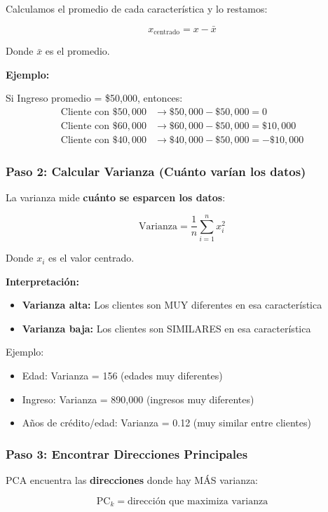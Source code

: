 \documentclass[11pt,a4paper,spanish]{article}
\begin{document}
Calculamos el promedio de cada característica y lo restamos:

\[
x_{\text{centrado}} = x - \bar{x}
\]

Donde $\bar{x}$ es el promedio.

\textbf{Ejemplo:}

Si Ingreso promedio = \$50,000, entonces:
\begin{align*}
\text{Cliente con } \$50,000 &\to \$50,000 - \$50,000 = 0\\
\text{Cliente con } \$60,000 &\to \$60,000 - \$50,000 = \$10,000\\
\text{Cliente con } \$40,000 &\to \$40,000 - \$50,000 = -\$10,000
\end{align*}

\subsubsection{Paso 2: Calcular Varianza (Cuánto varían los datos)}

La varianza mide \textbf{cuánto se esparcen los datos}:

\[
\text{Varianza} = \frac{1}{n}\sum_{i=1}^{n} x_i^2
\]

Donde $x_i$ es el valor centrado.

\textbf{Interpretación:}
\begin{itemize}
    \item \textbf{Varianza alta:} Los clientes son MUY diferentes en esa característica
    \item \textbf{Varianza baja:} Los clientes son SIMILARES en esa característica
\end{itemize}

Ejemplo:
\begin{itemize}
    \item Edad: Varianza = 156 (edades muy diferentes)
    \item Ingreso: Varianza = 890,000 (ingresos muy diferentes)
    \item Años de crédito/edad: Varianza = 0.12 (muy similar entre clientes)
\end{itemize}

\subsubsection{Paso 3: Encontrar Direcciones Principales}

PCA encuentra las \textbf{direcciones} donde hay MÁS varianza:

\[
\text{PC}_k = \text{dirección que maximiza varianza}
\]
\end{document}
